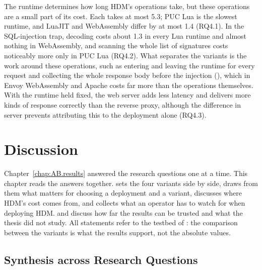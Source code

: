 \documentclass{rptuma}
\begin{document}
The runtime determines how long HDM's operations take, but these operations are a small part of its
cost. Each takes at most 5.3\us; PUC Lua is the slowest runtime, and LuaJIT and WebAssembly differ by
at most 1.4\us{} (RQ4.1). In the SQL-injection trap, decoding costs about 1.3\us{} in every Lua
runtime and almost nothing in WebAssembly, and scanning the whole list of signatures costs
noticeably more only in PUC Lua (RQ4.2). What separates the variants is the work around these
operations, such as entering and leaving the runtime for every request and collecting the whole
response body before the injection (), which in Envoy WebAssembly and Apache costs far more than the operations
themselves. With the runtime held fixed, the web
server adds less latency and delivers more kinds of response correctly than the reverse proxy,
although the difference in server prevents attributing this to the deployment alone (RQ4.3).

\chapter{Discussion}
\label{chap:discussion}

Chapter~\ref{chap:AB.results} answered the research questions one at a time. This chapter reads the
answers together.  sets the four variants side by side,
 draws from them what matters for choosing a deployment and a variant,
 discusses where HDM's cost comes from, and 
collects what an operator has to watch for when deploying HDM.  and
 discuss how far the results can be trusted and what the thesis did not
study. All statements refer to the testbed of : the comparison
between the variants is what the results support, not the absolute values.

\section{Synthesis across Research Questions}
\label{sec:disc.synthesis}
\end{document}
